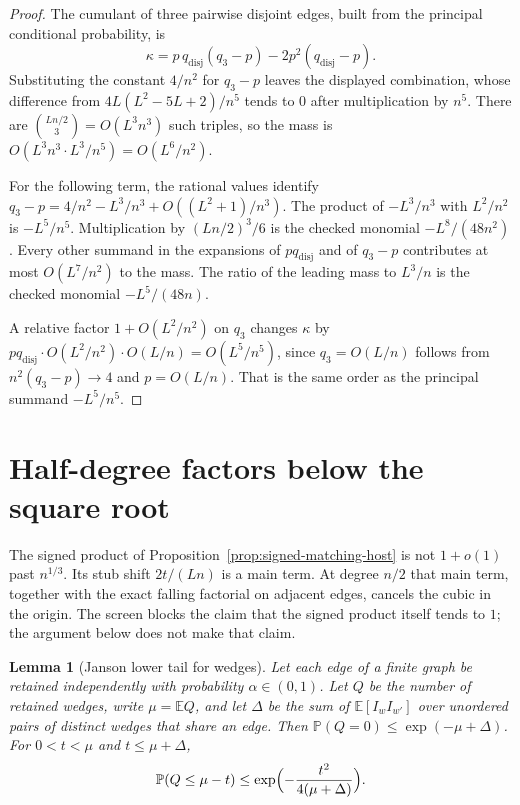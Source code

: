 \documentclass[11pt]{article}
\newtheorem{lemma}[theorem]{Lemma}
\newcommand{\EE}{\mathbb{E}}
\newcommand{\PP}{\mathbb{P}}
\begin{document}
\begin{proof}
The cumulant of three pairwise disjoint edges, built from the principal
conditional probability, is
\[
\kappa
=
p\,q_{\mathrm{disj}}(q_3-p)-2p^2(q_{\mathrm{disj}}-p).
\]
Substituting the constant \(4/n^2\) for \(q_3-p\) leaves the displayed
combination, whose difference from \(4L(L^2-5L+2)/n^5\) tends to \(0\) after
multiplication by \(n^5\). There are \(\binom{Ln/2}{3}=O(L^3 n^3)\) such
triples, so the mass is \(O(L^3 n^3\cdot L^3/n^5)=O(L^6/n^2)\).

For the following term, the rational values identify
\(q_3-p=4/n^2-L^3/n^3+O((L^2+1)/n^3)\).
The product of \(-L^3/n^3\) with \(L^2/n^2\) is \(-L^5/n^5\).
Multiplication by \((Ln/2)^3/6\) is the checked monomial
\(-L^8/(48n^2)\). Every other summand in the expansions of
\(p q_{\mathrm{disj}}\) and of \(q_3-p\) contributes at most \(O(L^7/n^2)\)
to the mass. The ratio of the leading mass to \(L^3/n\) is the checked
monomial \(-L^5/(48n)\).

A relative factor \(1+O(L^2/n^2)\) on \(q_3\) changes \(\kappa\) by
\(p q_{\mathrm{disj}}\cdot O(L^2/n^2)\cdot O(L/n)=O(L^5/n^5)\), since
\(q_3=O(L/n)\) follows from \(n^2(q_3-p)\to 4\) and \(p=O(L/n)\).
That is the same order as the principal summand \(-L^5/n^5\).
\end{proof}

\section{Half-degree factors below the square root}
\label{sec:half-below-sqrt}

The signed product of Proposition~\ref{prop:signed-matching-host} is not
\(1+o(1)\) past \(n^{1/3}\). Its stub shift \(2t/(Ln)\) is a main term.
At degree \(n/2\) that main term, together with the exact falling factorial
on adjacent edges, cancels the cubic in the origin. The screen blocks
the claim that the signed product itself tends to \(1\); the argument below
does not make that claim.

\begin{lemma}[Janson lower tail for wedges]
\label{lem:wedge-tail}
Let each edge of a finite graph be retained independently with probability
\(\alpha\in(0,1)\). Let \(Q\) be the number of retained wedges, write
\(\mu=\EE Q\), and let \(\Delta\) be the sum of \(\EE[I_w I_{w'}]\) over
unordered pairs of distinct wedges that share an edge. Then
\(\PP(Q=0)\le\exp(-\mu+\Delta)\). For \(0<t<\mu\) and \(t\le\mu+\Delta\),
\[
\PP(Q\le\mu-t)\le\exp\Bigl(-\frac{t^2}{4(\mu+\Delta)}\Bigr).
\]
\end{lemma}
\end{document}
